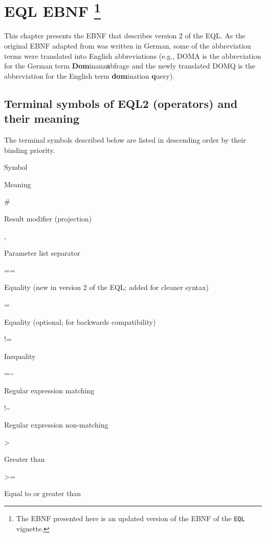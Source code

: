 \documentclass[]{book}
\begin{document}
\hypertarget{app-chap:EQL-EBNF}{%
\chapter[EQL EBNF ]{\texorpdfstring{EQL EBNF \footnote{The EBNF presented here is an updated version of the EBNF of the \texttt{EQL} vignette.}}{EQL EBNF }}\label{app-chap:EQL-EBNF}}

This chapter presents the EBNF \citep{garshol:2003a} that describes version 2 of the EQL. As the original EBNF adapted from \citet{john:2012a} was written in German, some of the abbreviation terms were translated into English abbreviations (e.g., DOMA is the abbreviation for the German term \textbf{Dom}inanz\textbf{a}bfrage and the newly translated DOMQ is the abbreviation for the English term \textbf{dom}ination \textbf{q}uery).

\hypertarget{terminal-symbols-of-eql2-operators-and-their-meaning}{%
\section{Terminal symbols of EQL2 (operators) and their meaning}\label{terminal-symbols-of-eql2-operators-and-their-meaning}}

The terminal symbols described below are listed in descending order by their binding priority.

Symbol

Meaning

\#

Result modifier (projection)

,

Parameter list separator

==

Equality (new in version 2 of the EQL; added for cleaner syntax)

=

Equality (optional; for backwards compatibility)

!=

Inequality

=\textasciitilde{}

Regular expression matching

!\textasciitilde{}

Regular expression non-matching

\textgreater{}

Greater than

\textgreater{}=

Equal to or greater than
\end{document}
